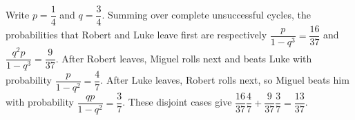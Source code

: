 Write $p=\dfrac{1}{4}$ and $q=\dfrac{3}{4}$. Summing over complete unsuccessful cycles, the probabilities that Robert and Luke leave first are respectively $\dfrac{p}{1-q^3}=\dfrac{16}{37}$ and $\dfrac{q^2p}{1-q^3}=\dfrac{9}{37}$. After Robert leaves, Miguel rolls next and beats Luke with probability $\dfrac{p}{1-q^2}=\dfrac{4}{7}$. After Luke leaves, Robert rolls next, so Miguel beats him with probability $\dfrac{qp}{1-q^2}=\dfrac{3}{7}$. These disjoint cases give $\dfrac{16}{37}\dfrac{4}{7}+\dfrac{9}{37}\dfrac{3}{7}=\boxed{\dfrac{13}{37}}$.
